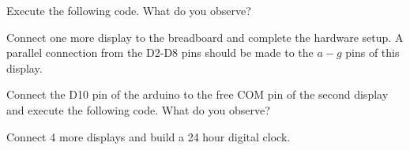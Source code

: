 %
\begin{problem}
Execute the following code.  What do you observe?
\end{problem}	
%

%
%
\begin{problem}
Connect one more display to the breadboard and complete the hardware setup.  A parallel connection from the D2-D8 pins should be made to the $a-g$ pins of this display.
\end{problem}	
%
%
\begin{problem}
Connect the D10 pin of the arduino to the free COM pin of the second display and execute the following code.  What do you observe?
\end{problem}	


%
%
\begin{problem}
Connect 4 more displays and build a 24 hour digital clock.
\end{problem}

%
%

